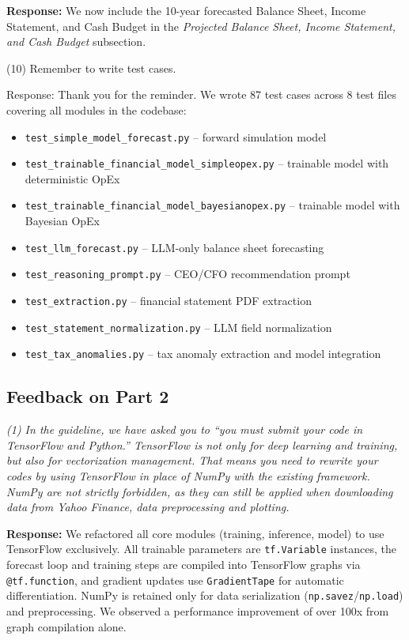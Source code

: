 \documentclass[12pt,a4paper]{article}
\begin{document}
\textbf{Response:} We now include the 10-year forecasted Balance Sheet,
Income Statement, and Cash Budget in the \emph{Projected Balance Sheet,
Income Statement, and Cash Budget} subsection.

(10) Remember to write test cases.

Response: Thank you for the reminder. We wrote 87 test cases across 8 test files
covering all modules in the codebase:

\begin{itemize}
\item \texttt{test\_simple\_model\_forecast.py} -- forward simulation model
\item \texttt{test\_trainable\_financial\_model\_simpleopex.py} -- trainable model with deterministic OpEx
\item \texttt{test\_trainable\_financial\_model\_bayesianopex.py} -- trainable model with Bayesian OpEx
\item \texttt{test\_llm\_forecast.py} -- LLM-only balance sheet forecasting
\item \texttt{test\_reasoning\_prompt.py} -- CEO/CFO recommendation prompt
\item \texttt{test\_extraction.py} -- financial statement PDF extraction
\item \texttt{test\_statement\_normalization.py} -- LLM field normalization
\item \texttt{test\_tax\_anomalies.py} -- tax anomaly extraction and model integration
\end{itemize}

\subsection{Feedback on Part 2}

\emph{(1) In the guideline, we have asked you to ``you must submit your
code in TensorFlow and Python.'' TensorFlow is not only for deep
learning and training, but also for vectorization management. That means
you need to rewrite your codes by using TensorFlow in place of NumPy
with the existing framework. NumPy are not strictly forbidden, as they
can still be applied when downloading data from Yahoo Finance, data
preprocessing and plotting.}

\textbf{Response:} We refactored all core modules (training, inference,
model) to use TensorFlow exclusively. All trainable parameters are
\texttt{tf.Variable} instances, the forecast loop and training steps are
compiled into TensorFlow graphs via \texttt{@tf.function}, and gradient
updates use \texttt{GradientTape} for automatic differentiation. NumPy
is retained only for data serialization (\texttt{np.savez}/\texttt{np.load})
and preprocessing. We observed a performance improvement of over 100x
from graph compilation alone.
\end{document}
